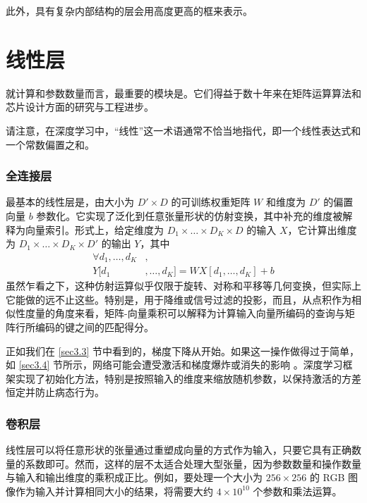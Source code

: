 此外，具有复杂内部结构的层会用高度更高的框来表示。

\section{线性层}\label{sec4.2}

就计算和参数数量而言，最重要的模块是。它们得益于数十年来在矩阵运算算法和芯片设计方面的研究与工程进步。

请注意，在深度学习中，``线性''这一术语通常不恰当地指代，即一个线性表达式和一个常数偏置之和。

\subsubsection*{全连接层}

最基本的线性层是，由大小为 $D' \times D$ 的可训练权重矩阵 $W$ 和维度为 $D'$ 的偏置向量 $b$ 参数化。它实现了泛化到任意张量形状的仿射变换，其中补充的维度被解释为向量索引。形式上，给定维度为 $D_1 \times \dots \times D_K \times D$ 的输入 $X$，它计算出维度为 $D_1 \times \dots \times D_K \times D'$ 的输出 $Y$，其中
\begin{align*}
    \forall d_1,\dots,d_K&,\\
    Y[d_1&,\dots,d_K] = WX[d_1,\dots,d_K]+b
\end{align*}
虽然乍看之下，这种仿射运算似乎仅限于旋转、对称和平移等几何变换，但实际上它能做的远不止这些。特别是，用于降维或信号过滤的投影，而且，从点积作为相似性度量的角度来看，矩阵-向量乘积可以解释为计算输入向量所编码的查询与矩阵行所编码的键之间的匹配得分。

正如我们在 \ref{sec3.3} 节中看到的，梯度下降从开始。如果这一操作做得过于简单，如 \ref{sec3.4} 节所示，网络可能会遭受激活和梯度爆炸或消失的影响 \citep{glorot10a}。深度学习框架实现了初始化方法，特别是按照输入的维度来缩放随机参数，以保持激活的方差恒定并防止病态行为。

\subsubsection*{卷积层}

线性层可以将任意形状的张量通过重塑成向量的方式作为输入，只要它具有正确数量的系数即可。然而，这样的层不太适合处理大型张量，因为参数数量和操作数量与输入和输出维度的乘积成正比。例如，要处理一个大小为 $256 \times 256$ 的 RGB 图像作为输入并计算相同大小的结果，将需要大约 $4 \times 10^{10}$ 个参数和乘法运算。

